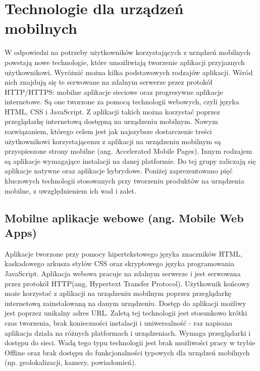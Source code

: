 \documentclass[a4paper,12pt,twoside,openany]{report}
\begin{document}
\section{Technologie dla urządzeń mobilnych}
W odpowiedzi na potrzeby użytkowników korzystających z urządzeń mobilnych powstają nowe technologie, które umożliwiają tworzenie aplikacji przyjaznych użytkownikowi. Wyróżnić można kilka podstawowych rodzajów aplikacji. W\'sród nich znajdują się te serwowane na zdalnym serwerze przez protokół HTTP/HTTPS: mobilne aplikacje sieciowe oraz progresywne aplikacje internetowe. Są one tworzone za pomocą technologii webowych, czyli języka HTML, CSS i JavaScript. Z aplikacji takich można korzystać poprzez przeglądarkę internetową dostępną na urządzeniu mobilnym. Nowym rozwiązaniem, którego celem jest jak najszybsze dostarczenie tre\'sci użytkownikowi korzystającemu z aplikacji na urządzeniu mobilnym są przyspieszone strony mobilne (ang. Accelerated Mobile Pages). Innym rodzajem są aplikacje wymagające instalacji na danej platformie. Do tej grupy zaliczają się aplikacje natywne oraz aplikacje hybrydowe. \newline Poniżej  zaprezentowano pięć kluczowych technologii stosowanych przy tworzeniu produktów na urządzenia mobilne, z uwzględnieniem ich wad i zalet.

\subsection*{Mobilne aplikacje webowe (ang. Mobile Web Apps)}
\noindent Aplikacje tworzone przy pomocy hipertekstowego języka znaczników HTML, kaskadowego arkusza stylów CSS oraz skryptowego języka programowania JavaScript. Aplikacja webowa pracuje na zdalnym serwerze i jest serwowana przez protokół HTTP(ang. Hypertext Transfer Protocol). Użytkownik końcowy może korzystać z aplikacji na urządzeniu mobilnym poprzez przeglądarkę internetową zainstalowaną na danym urządzeniu. Dostęp do aplikacji możliwy jest poprzez unikalny adres URL. Zaletą tej technologii jest stosunkowo krótki czas tworzenia, brak konieczno\'sci instalacji i uniwersalno\'sć - raz napisana aplikacja działa na różnych platformach i urządzeniach. Wymaga przeglądarki i dostępu do sieci. Wadą tego typu technologii jest brak możliwo\'sci pracy w trybie Offline oraz brak dostępu do funkcjonalno\'sci typowych dla urządzeń mobilnych (np. geolokalizacji, kamery, powiadomień).
\end{document}
